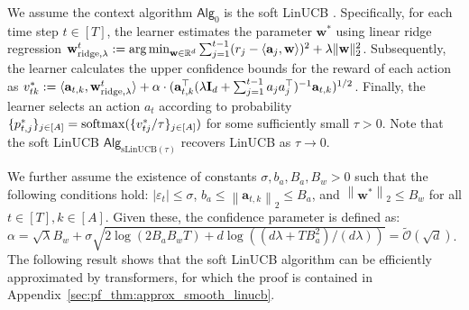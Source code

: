 \documentclass[10pt]{article}
\newcommand{\id}{\bI}
\newcommand{\eps}{\varepsilon}
\DeclareMathOperator*{\argmin}{arg\,min}
\newcommand{\norm}[1]{\left\|{#1}\right\|} %
\newcommand{\ltwo}[1]{\norm{#1}_2} %
\newcommand{\<}{\left\langle}
\renewcommand{\>}{\right\rangle}
\newcommand{\ridge}{{\rm ridge}}
\newcommand{\R}{\mathbb{R}}
\newcommand{\sLinUCB}{{\mathrm{sLinUCB}}}
\newcommand{\temp}{{\tau}}
\newcommand{\cwid}{{\alpha}}  %
\newcommand{\tcO}{{\tilde{\mathcal O}}}
\newcommand{\action}{{a}}
\newcommand{\reward}{{r}}
\newcommand{\totlen}{{T}} %
\newcommand{\softmax}{{\rm softmax}}
\newcommand{\sAlg}{{\mathsf{Alg}}}
\newcommand{\TrueLBPar}{{\bw^*}}
\newcommand{\Noise}{{\eps}}
\newcommand{\Numact}{{A}}
\def\bA{{\mathbf A}}
\def\bI{{\mathbf I}}
\def\ba{{\mathbf a}}
\def\bw{{\mathbf w}}
\newcommand{\authnote}[2]{{\scriptsize $\ll$\textsf{#1 notes: #2}$\gg$}}
\newcommand{\authnote}[2]{}
\newcommand{\lc}[1]{{\color{blue}\authnote{Licong}{#1}}}
\begin{document}
We assume the context algorithm $\sAlg_0$ is the soft LinUCB \citep{chu2011contextual}. Specifically, for each time step $t\in[\totlen]$, the learner estimates the parameter $\TrueLBPar$ using linear ridge regression $\bw^t_{\ridge,\lambda}:=\argmin_{\bw\in\R^d} \sum_{j=1}^{t-1}(\reward_j-\<\ba_j,\bw\>)^2+ \lambda \|\bw\|_2^2$. Subsequently, the learner calculates the upper confidence bounds for the reward of each action as $v^*_{tk}:=\langle \ba_{t,k},\bw^t_{\ridge,\lambda}\rangle +\cwid \cdot (\ba_{t,k}^\top (\lambda\id_d+\sum_{j=1}^{t-1}\action_j\action_j^\top)^{-1}  \ba_{t,k})^{1/2}$. Finally, the learner selects an action $\action_t$ according to probability $\{ p^*_{t,j} \}_{j \in [\Numact]} = \softmax(\{v^*_{tj}/\temp \}_{j \in [\Numact]})$ for some sufficiently small $\temp>0$. Note that the soft LinUCB $\sAlg_{\sLinUCB(\temp)}$ recovers LinUCB as $\temp\to 0$. 


We further assume the existence of constants $\sigma,b_a,B_a,B_w>0$ such that the following conditions hold:   $|\Noise_t|\leq\sigma$, $b_a\leq\ltwo{\ba_{t,k}}\leq B_a$, and $\ltwo{\bw^*}\le B_w$ for all $t\in[\totlen],k\in[\Numact]$. Given these, the confidence parameter is defined as: $\cwid=\sqrt{\lambda}B_w+\sigma\sqrt{2\log (2B_aB_w \totlen )+d\log((d\lambda+\totlen B_a^2)/(d\lambda))} = \tcO(\sqrt{d})$. The following result shows that the soft LinUCB algorithm can be efficiently approximated by transformers, for which the proof is contained in Appendix~\ref{sec:pf_thm:approx_smooth_linucb}. 
\end{document}

